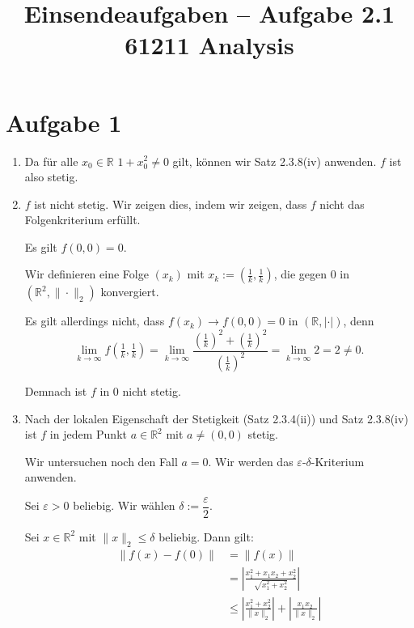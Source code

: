 \documentclass[a4paper,12pt]{article}
\title{Einsendeaufgaben -- Aufgabe 2.1\\[0.5em]
\large 61211 Analysis}
\author{}
\date{}
\begin{document}
\maketitle

\section*{Aufgabe 1}

\begin{enumerate}[label=\alph*)]

    \item
    Da für alle $x_0 \in \mathbb{R}$ $1 + x_0^2 \neq 0$ gilt, können wir Satz 2.3.8(iv) anwenden.
    $f$ ist also stetig.

    \item
    $f$ ist nicht stetig. Wir zeigen dies, indem wir zeigen, dass $f$ nicht das Folgenkriterium erfüllt.

    Es gilt $f(0,0) = 0$.

    Wir definieren eine Folge $(x_k)$ mit $x_k := \left(\frac{1}{k}, \frac{1}{k}\right)$, die gegen 0 in $(\mathbb{R}^2, \|\cdot\|_2)$ konvergiert.

    Es gilt allerdings nicht, dass $f(x_k) \to f(0,0) = 0$ in $(\mathbb{R}, |\cdot|)$, denn
    \[
        \lim_{k \to \infty} f\!\left(\tfrac{1}{k}, \tfrac{1}{k}\right)
        = \lim_{k \to \infty} \frac{\left(\tfrac{1}{k}\right)^2 + \left(\tfrac{1}{k}\right)^2}{\left(\tfrac{1}{k}\right)^2}
        = \lim_{k \to \infty} 2 = 2 \neq 0.
    \]

    Demnach ist $f$ in 0 nicht stetig.

    \item
    Nach der lokalen Eigenschaft der Stetigkeit (Satz 2.3.4(ii)) und Satz 2.3.8(iv) ist $f$ in jedem
    Punkt $a \in \mathbb{R}^2$ mit $a \neq (0,0)$ stetig.

    Wir untersuchen noch den Fall $a = 0$. Wir werden das $\varepsilon$-$\delta$-Kriterium anwenden.

    Sei $\varepsilon > 0$ beliebig. Wir wählen $\delta := \dfrac{\varepsilon}{2}$.

    Sei $x \in \mathbb{R}^2$ mit $\|x\|_2 \leq \delta$ beliebig. Dann gilt:
    \begin{align*}
        \|f(x) - f(0)\| &= \|f(x)\| \\
        &= \left|\frac{x_1^2 + x_1 x_2 + x_2^2}{\sqrt{x_1^2 + x_2^2}}\right| \\
        &\leq \left|\frac{x_1^2 + x_2^2}{\|x\|_2}\right| + \left|\frac{x_1 x_2}{\|x\|_2}\right|
    \end{align*}


\end{enumerate}
\end{document}
